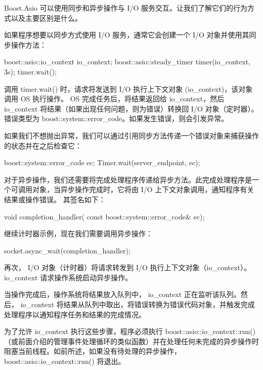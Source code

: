 

Boost.Asio 可以使用同步和异步操作与 I/O 服务交互。让我们了解它们的行为方式以及主要区别是什么。


如果程序想要以同步方式使用 I/O 服务，通常它会创建一个 I/O 对象并使用其同步操作方法：

\begin{cpp}
boost::asio::io_context io_context;
boost::asio::steady_timer timer(io_context, 3s);
timer.wait();
\end{cpp}

调用 timer.wait() 时，请求将发送到 I/O 执行上下文对象 (io\_context)，该对象调用 OS 执行操作。 OS 完成任务后，将结果返回给 io\_context，然后 io\_context 将结果（如果出现任何问题，则为错误）转换回 I/O 对象（定时器）。错误类型为 boost::system::error\_code。如果发生错误，则会引发异常。

如果我们不想抛出异常，我们可以通过引用同步方法传递一个错误对象来捕获操作的状态并在之后检查它：

\begin{cpp}
boost::system::error_code ec;
Timer.wait(server_endpoint, ec);
\end{cpp}


对于异步操作，我们还需要将完成处理程序传递给异步方法。此完成处理程序是一个可调用对象，当异步操作完成时，它将由 I/O 上下文对象调用，通知程序有关结果或操作错误。
其签名如下：

\begin{cpp}
void completion_handler(
    const boost::system::error_code& ec);
\end{cpp}

继续计时器示例，现在我们需要调用异步操作：

\begin{cpp}
socket.async_wait(completion_handler);
\end{cpp}

再次， I/O 对象（计时器）将请求转发到 I/O 执行上下文对象（io\_context）。 io\_context 请求操作系统启动异步操作。

当操作完成后，操作系统将结果放入队列中， io\_context 正在监听该队列。然后， io\_context 将结果从队列中取出，将错误转换为错误代码对象，并触发完成处理程序以通知程序任务和结果的完成情况。

为了允许 io\_context 执行这些步骤，程序必须执行 boost::asio::io\_context::run()（或前面介绍的管理事件处理循环的类似函数）并在处理任何未完成的异步操作时阻塞当前线程。如前所述，如果没有待处理的异步操作， boost::asio::io\_context::run() 将退出。

